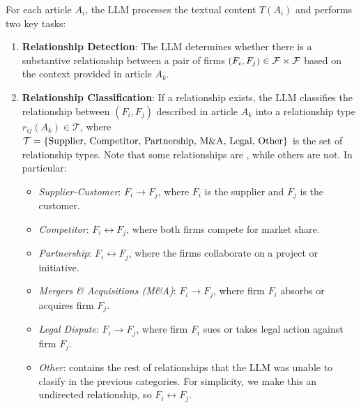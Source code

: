 For each article $ A_i $, the LLM processes the textual content $ T(A_i) $ and performs two key tasks:
\begin{enumerate}
    \item \textbf{Relationship Detection}: The LLM determines whether there is a substantive relationship between a pair of firms $(F_i,F_j)\in\mathcal{F}\times\mathcal{F}$ based on the context provided in article $A_k$.
    \item \textbf{Relationship Classification}: If a relationship exists, the LLM classifies the relationship between $(F_i,F_j)$ described in article $A_k$ into a relationship type $ r_{ij}(A_k) \in \mathcal{T} $, where $\mathcal{T}=\{\text{Supplier, Competitor, Partnership, M\&A, Legal, Other}\}$ is the set of relationship types. Note that some relationships are , while others are not. In particular:
    \begin{itemize}
        \item \textit{Supplier-Customer}: $ F_i \to F_j $, where $ F_i $ is the supplier and $ F_j $ is the customer.
        \item \textit{Competitor}: $ F_i \leftrightarrow F_j $, where both firms compete for market share.
        \item \textit{Partnership}: $ F_i \leftrightarrow F_j $, where the firms collaborate on a project or initiative.
        \item \textit{Mergers \& Acquisitions (M\&A)}: $ F_i \to F_j $, where firm $ F_i $ absorbs or acquires firm $ F_j $.
        \item \textit{Legal Dispute}: $ F_i \to F_j $, where firm $ F_i $ sues or takes legal action against firm $ F_j $.
        \item \textit{Other}: contains the rest of relationships that the LLM was unable to clasify in the previous categories. For simplicity, we make this an undirected relationship, so $F_i\leftrightarrow F_j$. 
    \end{itemize}
\end{enumerate}

